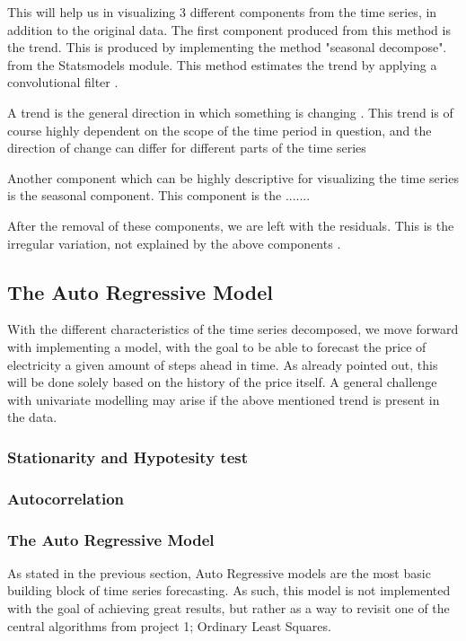\documentclass
[twocolumn,
secnumarabic,
nobibnotes,
aps,
prl,
reprint,
groupedaddress,
amsmath,
amssymb,
]{revtex4-2}
\begin{document}
This will help us in visualizing 3 different components from the time series, in addition to the original data. The first component produced from this method is the trend. This is produced by implementing the method "seasonal decompose". from the Statsmodels module. This method estimates the trend by applying a convolutional filter \cite{seabold2010statsmodels}. 

A trend is the general direction in which something is changing \cite{Auffarth2021}. This trend is of course highly dependent on the scope of the time period in question, and the direction of change can differ for different parts of the time series \cite{Vishwas2020}  


Another component which can be highly descriptive for visualizing the time series is the seasonal component. This component is the .......


After the removal of these components, we are left with the residuals. This is the irregular variation, not explained by the above components \cite{Vishwas2020}.

\subsection{The Auto Regressive Model}
With the different characteristics of the time series decomposed, we move forward with implementing a model, with the goal to be able to forecast the price of electricity a given amount of steps ahead in time. As already pointed out, this will be done solely based on the history of the price itself. A general challenge with univariate modelling may arise if the above mentioned trend is present in the data. 

\subsubsection{Stationarity and Hypotesity test}

\subsubsection{Autocorrelation}
\subsubsection{The Auto Regressive Model}
As stated in the previous section, Auto Regressive models are the most basic building block of time series forecasting. As such, this model is not implemented with the goal of achieving great results, but rather as a way to revisit one of the central algorithms from project 1; Ordinary Least Squares.
\end{document}
